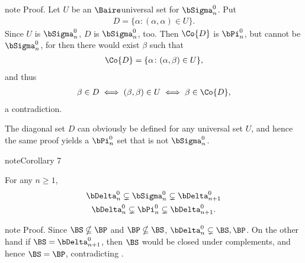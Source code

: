 \documentclass[letterpaper,10pt,english]{jupyterBook}
\begin{document}
\begin{sphinxadmonition}{note}
\sphinxAtStartPar
Proof. Let \(U\) be an \(\Baire\)\sphinxhyphen{}universal set for \(\bSigma^0_n\). Put
\begin{equation*}
\begin{split}
    D = \{ \alpha \colon (\alpha, \alpha) \in U \}.
\end{split}
\end{equation*}
\sphinxAtStartPar
Since \(U\) is \(\bSigma^0_n\), \(D\) is \(\bSigma^0_n\), too. Then \(\Co{D}\) is \(\bPi^0_n\), but cannot be \(\bSigma^0_n\), for then there would exist \(\beta\) such that
\begin{equation*}
\begin{split}
    \Co{D} = \{ \alpha \colon (\alpha, \beta) \in U \},
\end{split}
\end{equation*}
\sphinxAtStartPar
and thus
\begin{equation*}
\begin{split}
    \beta \in D \iff (\beta, \beta) \in U \iff \beta \in \Co{D}, 
\end{split}
\end{equation*}
\sphinxAtStartPar
a contradiction.
\end{sphinxadmonition}

\sphinxAtStartPar
The diagonal set \(D\) can obviously be defined for any universal set \(U\), and hence the same proof yields a \(\bPi^0_n\) set that is not \(\bSigma^0_n\).
\label{structureBorel:cor-hier-proper}
\begin{sphinxadmonition}{note}{Corollary 7}



\sphinxAtStartPar
For any \(n \geq 1\),
\begin{gather*}
    \bDelta^0_n \subsetneq \bSigma^0_n \subsetneq \bDelta^0_{n+1} \\
    \bDelta^0_n \subsetneq \bPi^0_n \subsetneq \bDelta^0_{n+1}.
\end{gather*}\end{sphinxadmonition}

\begin{sphinxadmonition}{note}
\sphinxAtStartPar
Proof. Since \(\BS \nsubseteq \BP\) and \(\BP \nsubseteq \BS\), \(\bDelta^0_n \subsetneq \BS,\BP\). On the other hand if \(\BS = \bDelta^0_{n+1}\), then \(\BS\) would be closed under complements, and hence \(\BS = \BP\), contradicting {\hyperref[\detokenize{structureBorel:thm-Borel-proper}]{}}.
\end{sphinxadmonition}
\end{document}
